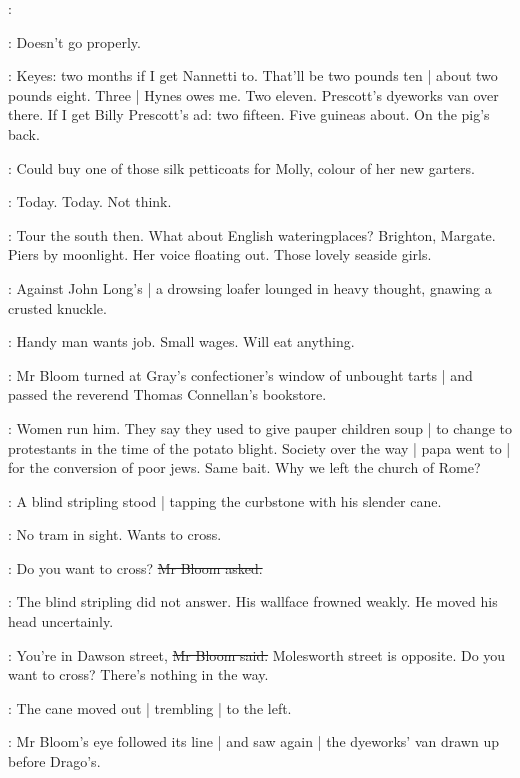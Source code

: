 \BloomInt:

\BloomInt:
Doesn't go properly.

\BloomInt:
Keyes: two months if I get Nannetti to.
That'll be two pounds ten |
about two pounds eight.
Three |
Hynes owes me.
Two eleven.
Prescott's dyeworks van over there.
If I get Billy Prescott's ad:
two fifteen.
Five guineas about.
On the pig's back.

\BloomInt:
Could buy one of those silk petticoats for Molly,
colour of her new garters.

\BloomInt:
Today.
Today.
Not think.

\BloomInt:
Tour the south then.
What about English wateringplaces?
Brighton, Margate.
Piers by moonlight.
Her voice floating out.
Those lovely seaside girls.

:
Against John Long's |
a drowsing loafer lounged in heavy thought,
gnawing a crusted knuckle.

\BloomInt:
Handy man wants job.
Small wages.
Will eat anything.

:
Mr Bloom turned at Gray's confectioner's window of unbought tarts |
and passed the reverend Thomas Connellan's bookstore.

\BloomInt:
Women run him.
They say they used to give pauper children soup |
to change to protestants in the time of the potato blight.
Society over the way |
papa went to |
for the conversion of poor jews.
Same bait.
Why we left the church of Rome?

:
A blind stripling stood |
tapping the curbstone with his slender cane.

\BloomInt:
No tram in sight.
Wants to cross.

\Bloom:
Do you want to cross?
\sout{Mr Bloom asked.}

:
The blind stripling did not answer.
His wallface frowned weakly.
He moved his head uncertainly.

\Bloom:
You're in Dawson street,
\sout{Mr Bloom said.}
Molesworth street is opposite.
Do you want to cross?
There's nothing in the way.

:
The cane moved out |
trembling |
to the left.

:
Mr Bloom's eye followed its line |
and saw again |
the dyeworks' van drawn up before Drago's.

